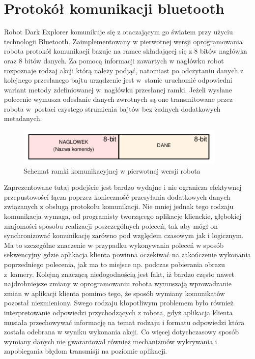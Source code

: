 \section{Protokół komunikacji bluetooth}
\label{sec:bt-comm}
Robot Dark Explorer komunikuje się z otaczającym go światem przy użyciu
technologii Bluetooth. Zaimplementowany w pierwotnej wersji oprogramowania
robota protokół komunikacji bazuje na ramce składającej się z 8 bitów nagłówka oraz 8 bitów
danych. Za pomocą informacji zawartych w nagłówku robot rozpoznaje
rodzaj akcji którą należy podjąć, natomiast po odczytaniu danych z kolejnego
przesłanego bajtu urządzenie jest w~stanie uruchomić odpowiedni wariant metody
zdefiniowanej w~nagłówku przesłanej ramki. Jeżeli wysłane polecenie wymusza
odesłanie danych zwrotnych są one transmitowane przez robota w~postaci czystego
strumienia bajtów bez żadnych dodatkowych metadanych.

\begin{figure}[h!]
 \centering
 \includegraphics[height=18mm]{../images/ch05/old_req_schema.png}
 \caption{Schemat ramki komunikacyjnej w pierwotnej wersji robota}
 \label{fig:OldCommFrame}
\end{figure}

Zaprezentowane tutaj podejście jest bardzo wydajne i nie ogranicza efektywnej
przepustowości łącza poprzez konieczność przesyłania dodatkowych danych
związanych z obsługą protokołu komunikacji. Nie mniej jednak tego rodzaju
komunikacja wymaga, od programisty tworzącego aplikacje klienckie, głębokiej
znajomości sposobu realizacji poszczególnych poleceń, tak aby mógł on
synchronizować komunikację zarówno pod względem czasowym jak i logicznym. Ma to
szczególne znaczenie w przypadku wykonywania poleceń w sposób sekwencyjny gdzie
aplikacja klienta powinna oczekiwać na zakończenie wykonania poprzedniego
polecenia, jak ma to miejsce np. podczas pobierania obrazu z~kamery. Kolejną
znaczącą niedogodnością jest fakt, iż bardzo często nawet najdrobniejsze zmiany w
oprogramowaniu robota wymuszają wprowadzanie zmian w aplikacji klienta pomimo
tego, że sposób wymiany komunikatów pozostał niezmieniony. Swego rodzaju
kłopotliwym problemem było również interpretowanie odpowiedzi przychodzących z
robota, gdyż aplikacja klienta musiała przechowywać informację na temat rodzaju i
formatu odpowiedzi która została odebrana w wyniku wykonania akcji. Co więcej
dotychczasowy sposób wymiany danych nie gwarantował również mechanizmów
wykrywania i zapobiegania błędom transmisji na poziomie aplikacji.


